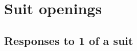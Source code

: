 \documentclass[oneside]{memoir}
\begin{document}
\chapter{Suit openings}

\section{Responses to 1 of a suit}

\end{document}
